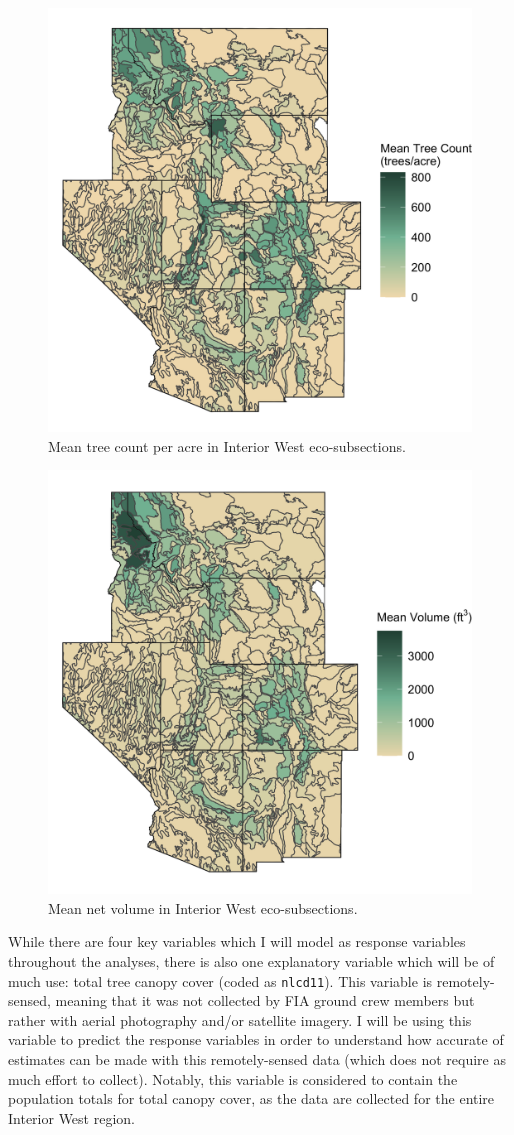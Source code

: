 \documentclass[12pt,twoside]{reedthesis}
\begin{document}
\begin{figure}

{\centering \includegraphics[width=0.65\linewidth]{figure/count_new} 

}

\caption[Mean tree count per acre in Interior West eco-subsections]{Mean tree count per acre in Interior West eco-subsections.}\label{fig:m3}
\end{figure}
\begin{figure}

{\centering \includegraphics[width=0.65\linewidth]{figure/voln_new} 

}

\caption[Mean net volume in Interior West eco-subsections]{Mean net volume in Interior West eco-subsections.}\label{fig:m4}
\end{figure}
While there are four key variables which I will model as response variables throughout the analyses, there is also one explanatory variable which will be of much use: total tree canopy cover (coded as \texttt{nlcd11}). This variable is remotely-sensed, meaning that it was not collected by FIA ground crew members but rather with aerial photography and/or satellite imagery. I will be using this variable to predict the response variables in order to understand how accurate of estimates can be made with this remotely-sensed data (which does not require as much effort to collect). Notably, this variable is considered to contain the population totals for total canopy cover, as the data are collected for the entire Interior West region.
\end{document}
